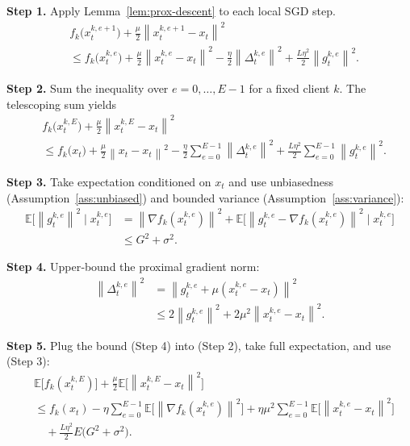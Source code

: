 \documentclass{article}
\newcommand{\E}{\mathbb{E}}
\newcommand{\norm}[1]{\left\|#1\right\|}
\begin{document}
\noindent\textbf{Step 1.} Apply Lemma~\ref{lem:prox-descent} to each local SGD step.
\[
\begin{aligned}
&f_k\!\big(x_{t}^{k,e+1}\big)+\frac{\mu}{2}\norm{x_{t}^{k,e+1}-x_t}^2 \\
&\le f_k\!\big(x_{t}^{k,e}\big)+\frac{\mu}{2}\norm{x_{t}^{k,e}-x_t}^2
-\frac{\eta}{2}\norm{\Delta_{t}^{k,e}}^2
+\frac{L\eta^2}{2}\norm{g_{t}^{k,e}}^2 .
\end{aligned}
\tag{Step 1}
\]

\noindent\textbf{Step 2.} Sum the inequality over $e=0,\dots,E-1$ for a fixed client $k$.
The telescoping sum yields
\[
\begin{aligned}
&f_k\!\big(x_{t}^{k,E}\big)+\frac{\mu}{2}\norm{x_{t}^{k,E}-x_t}^2\\
&\le f_k\!\big(x_{t}\big)+\frac{\mu}{2}\norm{x_{t}-x_t}^2
-\frac{\eta}{2}\sum_{e=0}^{E-1}\norm{\Delta_{t}^{k,e}}^2
+\frac{L\eta^2}{2}\sum_{e=0}^{E-1}\norm{g_{t}^{k,e}}^2 .
\end{aligned}
\tag{Step 2}
\]

\noindent\textbf{Step 3.} Take expectation conditioned on $x_t$ and use unbiasedness
(Assumption~\ref{ass:unbiased}) and bounded variance (Assumption~\ref{ass:variance}):
\[
\begin{aligned}
\E\!\big[\norm{g_{t}^{k,e}}^2\mid x_{t}^{k,e}\big]
&=\norm{\nabla f_k(x_{t}^{k,e})}^2+\E\!\big[\norm{g_{t}^{k,e}-\nabla f_k(x_{t}^{k,e})}^2\mid x_{t}^{k,e}\big]\\
&\le G^2+\sigma^2 .
\end{aligned}
\tag{Step 3}
\]

\noindent\textbf{Step 4.} Upper‑bound the proximal gradient norm:
\[
\begin{aligned}
\norm{\Delta_{t}^{k,e}}^2
&=\norm{g_{t}^{k,e}+\mu(x_{t}^{k,e}-x_t)}^2\\
&\le 2\norm{g_{t}^{k,e}}^2+2\mu^2\norm{x_{t}^{k,e}-x_t}^2 .
\end{aligned}
\tag{Step 4}
\]

\noindent\textbf{Step 5.} Plug the bound (Step 4) into (Step 2), take full expectation,
and use (Step 3):
\[
\begin{aligned}
&\E\!\big[f_k(x_{t}^{k,E})\big]+\frac{\mu}{2}\E\!\big[\norm{x_{t}^{k,E}-x_t}^2\big]\\
&\le f_k(x_t)
-\eta\sum_{e=0}^{E-1}\E\!\big[\norm{\nabla f_k(x_{t}^{k,e})}^2\big]
+\eta\mu^2\sum_{e=0}^{E-1}\E\!\big[\norm{x_{t}^{k,e}-x_t}^2\big]\\
&\quad+\frac{L\eta^2}{2}E\big(G^2+\sigma^2\big).
\end{aligned}
\tag{Step 5}
\]
\end{document}
